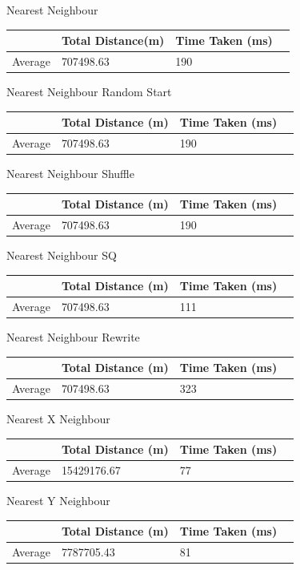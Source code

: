 \documentclass[conference,backref=page]{acmsiggraph}
\begin{document}
\begin{center}	
	
	Nearest Neighbour
	\begin{tabular}{| l | l | l | l |}
		\hline
		& Total Distance(m)& Time Taken (ms)\\ \hline
		Average & 707498.63 & 190 \\ \hline
	\end{tabular}

	Nearest Neighbour Random Start
	\begin{tabular}{| l | l | l | l |}
		\hline
		& Total Distance (m) & Time Taken (ms)\\ \hline
		Average & 707498.63 & 190 \\ \hline
	\end{tabular}

	Nearest Neighbour Shuffle
	\begin{tabular}{| l | l | l | l |}
		\hline
		& Total Distance (m) & Time Taken (ms)\\ \hline
		Average & 707498.63 & 190 \\ \hline
	\end{tabular}

	Nearest Neighbour SQ
	\begin{tabular}{| l | l | l | l |}
		\hline
		& Total Distance (m) & Time Taken (ms)\\ \hline
		Average & 707498.63 & 111 \\ \hline
	\end{tabular}

	Nearest Neighbour Rewrite
	\begin{tabular}{| l | l | l | l |}
		\hline
		& Total Distance (m) & Time Taken (ms)\\ \hline
		Average & 707498.63 & 323 \\ \hline
	\end{tabular}
	
	
	Nearest X Neighbour	
	\begin{tabular}{| l | l | l | l |}
		\hline
		& Total Distance (m) & Time Taken (ms)\\ \hline
		Average & 15429176.67 & 77 \\ \hline	
	\end{tabular}
	
	Nearest Y Neighbour	
	\begin{tabular}{| l | l | l | l |}
		\hline
		& Total Distance (m) & Time Taken (ms)\\ \hline
		Average & 7787705.43 & 81 \\ \hline
	\end{tabular}
\end{center}
\end{document}
